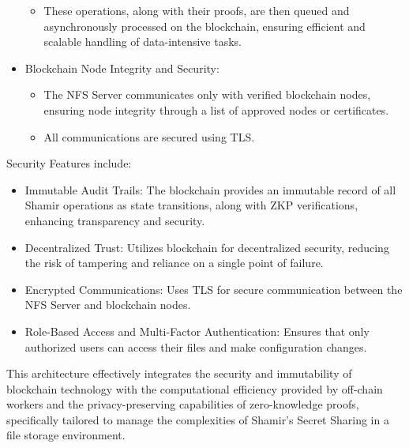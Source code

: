 \documentclass{tufte-handout}
\begin{document}
\begin{itemize}
\begin{itemize}
\item These operations, along with their proofs, are then queued and asynchronously processed on the blockchain, ensuring efficient and scalable handling of data-intensive tasks.
\end{itemize}
\item Blockchain Node Integrity and Security:
\begin{itemize}
\item The NFS Server communicates only with verified blockchain nodes, ensuring node integrity through a list of approved nodes or certificates.
\item All communications are secured using TLS.
\end{itemize}
\end{itemize}

Security Features include:
\begin{itemize}
\item Immutable Audit Trails: The blockchain provides an immutable record of all Shamir operations as state transitions, along with ZKP verifications,
enhancing transparency and security.
\item Decentralized Trust: Utilizes blockchain for decentralized security, reducing the risk of tampering and reliance on a single point of failure.
\item Encrypted Communications: Uses TLS for secure communication between the NFS Server and blockchain nodes.
\item Role-Based Access and Multi-Factor Authentication: Ensures that only authorized users can access their files and make configuration changes.
\end{itemize}

This architecture effectively integrates the security and immutability of blockchain technology with the computational efficiency provided by off-chain workers
and the privacy-preserving capabilities of zero-knowledge proofs, specifically tailored to manage the complexities of Shamir's Secret Sharing in a file storage environment.



\end{document}
